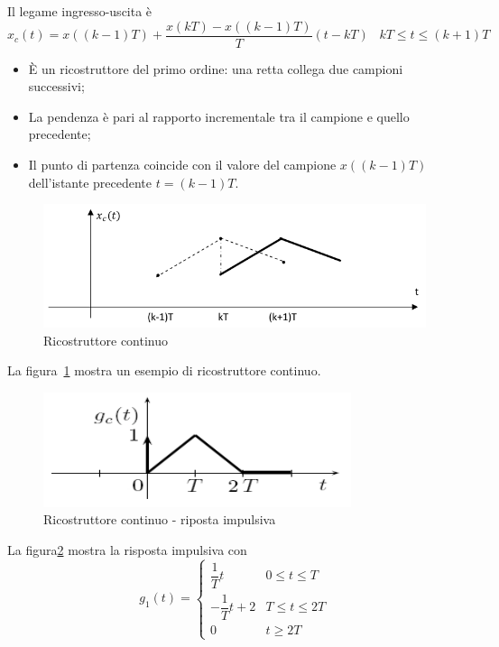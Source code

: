 \documentclass[a4paper]{report}
\begin{document}
Il legame ingresso-uscita \`e
\begin{equation}
  x_c(t) = x((k - 1)T) + \dfrac{x(kT) - x((k - 1)T)}{T}(t - kT) \;\;\;
  kT \leq t \leq (k + 1)T
\end{equation}
\begin{itemize}
\item \`E un ricostruttore del primo ordine: una retta collega due
  campioni successivi;
\item La pendenza \`e pari al rapporto incrementale tra il campione e
  quello precedente;
\item Il punto di partenza coincide con il valore del campione $x((k -
  1)T)$ dell'istante precedente $t = (k -1)T$.
\end{itemize}
\begin{figure}[!h]
  \begin{center}
    \includegraphics[scale=0.4]{./figures/ricostruttoreContinuo00.png}
    \caption{Ricostruttore continuo}\label{fig:ricostruttoreContinuo00}
  \end{center}
\end{figure}
La figura~\ref{fig:ricostruttoreContinuo00} mostra un esempio di
ricostruttore continuo.
\begin{figure}[!h]
  \begin{center}
    \includegraphics[scale=0.5]{./figures/ricostruttoreContinuo01.png}
    \caption{Ricostruttore continuo - riposta
      impulsiva}\label{fig:ricostruttoreContinuo01} 
  \end{center}
\end{figure}
La figura\ref{fig:ricostruttoreContinuo01} mostra la risposta
impulsiva con
\begin{equation}
  g_1(t) = 
  \left\{
  \begin{array}{ll}
    \dfrac{1}{T}t & 0 \leq t \leq T\\
    - \dfrac{1}{T}t + 2 & T \leq t \leq 2T\\
    0 & t \geq 2 T
  \end{array}
  \right.
\end{equation}
\end{document}
